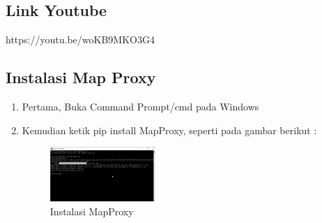 \subsection{Link Youtube}
https://youtu.be/woKB9MKO3G4
\subsection{Instalasi Map Proxy}
\begin{enumerate}
  \item Pertama, Buka Command Prompt/cmd pada Windows
  \item Kemudian ketik pip install MapProxy, seperti pada gambar berikut :
  \hfill\break
  \begin{figure}[H]
  \includegraphics[width=4cm]{figures/tugas4/1174054/25.png}
  \centering
  \caption{Instalasi MapProxy}
  \end{figure}
\end{enumerate}
